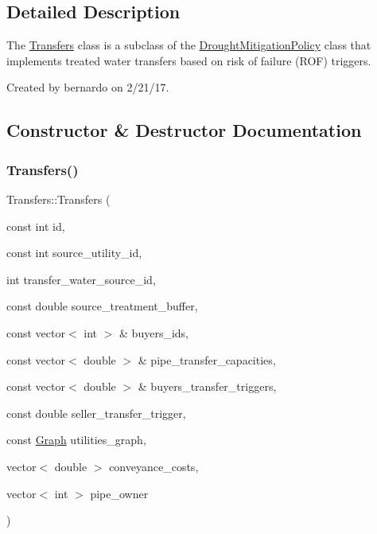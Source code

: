 \subsection{Detailed Description}
The {\ttfamily \mbox{\hyperlink{classTransfers}{Transfers}}} class is a subclass of the {\ttfamily \mbox{\hyperlink{classDroughtMitigationPolicy}{Drought\+Mitigation\+Policy}}} class that implements treated water transfers based on risk of failure (R\+OF) triggers. 

Created by bernardo on 2/21/17. 

\subsection{Constructor \& Destructor Documentation}
\mbox{\label{classTransfers_ae6abf817349382b66abc9cc3f45193a1}} 
\subsubsection{\texorpdfstring{Transfers()}{Transfers()}\hspace{0.1cm}{\footnotesize\ttfamily [1/2]}}
{\footnotesize\ttfamily Transfers\+::\+Transfers (\begin{DoxyParamCaption}\item[{const int}]{id,  }\item[{const int}]{source\+\_\+utility\+\_\+id,  }\item[{int}]{transfer\+\_\+water\+\_\+source\+\_\+id,  }\item[{const double}]{source\+\_\+treatment\+\_\+buffer,  }\item[{const vector$<$ int $>$ \&}]{buyers\+\_\+ids,  }\item[{const vector$<$ double $>$ \&}]{pipe\+\_\+transfer\+\_\+capacities,  }\item[{const vector$<$ double $>$ \&}]{buyers\+\_\+transfer\+\_\+triggers,  }\item[{const double}]{seller\+\_\+transfer\+\_\+trigger,  }\item[{const \mbox{\hyperlink{classGraph}{Graph}}}]{utilities\+\_\+graph,  }\item[{vector$<$ double $>$}]{conveyance\+\_\+costs,  }\item[{vector$<$ int $>$}]{pipe\+\_\+owner }\end{DoxyParamCaption})}



